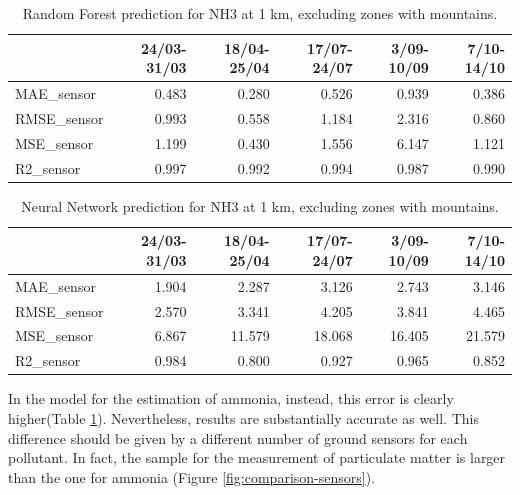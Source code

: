 \begin{table}[H]
\begin{tabular}{lrrrrr}
\toprule
  &  24/03-31/03 &  18/04-25/04 &  17/07-24/07 &  3/09-10/09 &  7/10-14/10 \\
\midrule
 MAE\_sensor &        0.483 &        0.280 &        0.526 &       0.939 &       0.386 \\
RMSE\_sensor &        0.993 &        0.558 &        1.184 &       2.316 &       0.860 \\
 MSE\_sensor &        1.199 &        0.430 &        1.556 &       6.147 &       1.121 \\
  R2\_sensor &        0.997 &        0.992 &        0.994 &       0.987 &       0.990 \\
\bottomrule
\end{tabular}
\caption{Random Forest prediction for NH3 at 1 km, excluding zones with mountains.}
\label{tab:nh3RF}
\end{table}
\begin{table}[H]
\begin{tabular}{lrrrrr}
\toprule
  &  24/03-31/03 &  18/04-25/04 &  17/07-24/07 &  3/09-10/09 &  7/10-14/10 \\
\midrule
 MAE\_sensor &        1.904 &        2.287 &        3.126 &       2.743 &       3.146 \\
RMSE\_sensor &        2.570 &        3.341 &        4.205 &       3.841 &       4.465 \\
 MSE\_sensor &        6.867 &       11.579 &       18.068 &      16.405 &      21.579 \\
  R2\_sensor &        0.984 &        0.800 &        0.927 &       0.965 &       0.852 \\
\bottomrule
\end{tabular}
\caption{Neural Network prediction for NH3 at 1 km, excluding zones with mountains.}
\label{tab:nh3NN}
\end{table}
In the model for the estimation of ammonia, instead, this error is clearly higher(Table \ref{tab:nh3RF}).
Nevertheless, results are substantially accurate as well. 
This difference should be given by a different number of ground sensors for each pollutant. In fact, the sample for the measurement of particulate matter is larger than the one for ammonia (Figure \ref{fig:comparison-sensors}).
